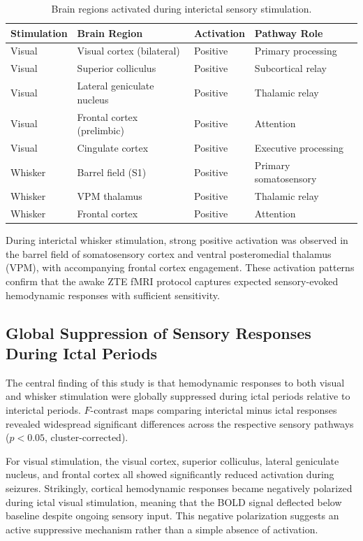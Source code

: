 \documentclass[12pt]{article}
\begin{document}
\begin{table}[htbp]
\centering
\caption{Brain regions activated during interictal sensory stimulation.}
\label{tab:visual}
\begin{tabular}{llll}
\toprule
Stimulation & Brain Region & Activation & Pathway Role \\
\midrule
Visual & Visual cortex (bilateral) & Positive & Primary processing \\
Visual & Superior colliculus & Positive & Subcortical relay \\
Visual & Lateral geniculate nucleus & Positive & Thalamic relay \\
Visual & Frontal cortex (prelimbic) & Positive & Attention \\
Visual & Cingulate cortex & Positive & Executive processing \\
Whisker & Barrel field (S1) & Positive & Primary somatosensory \\
Whisker & VPM thalamus & Positive & Thalamic relay \\
Whisker & Frontal cortex & Positive & Attention \\
\bottomrule
\end{tabular}
\end{table}

During interictal whisker stimulation, strong positive activation was observed in the barrel field of somatosensory cortex and ventral posteromedial thalamus (VPM), with accompanying frontal cortex engagement. These activation patterns confirm that the awake ZTE fMRI protocol captures expected sensory-evoked hemodynamic responses with sufficient sensitivity.

\subsection{Global Suppression of Sensory Responses During Ictal Periods}

The central finding of this study is that hemodynamic responses to both visual and whisker stimulation were globally suppressed during ictal periods relative to interictal periods. $F$-contrast maps comparing interictal minus ictal responses revealed widespread significant differences across the respective sensory pathways ($p < 0.05$, cluster-corrected).

For visual stimulation, the visual cortex, superior colliculus, lateral geniculate nucleus, and frontal cortex all showed significantly reduced activation during seizures. Strikingly, cortical hemodynamic responses became negatively polarized during ictal visual stimulation, meaning that the BOLD signal deflected below baseline despite ongoing sensory input. This negative polarization suggests an active suppressive mechanism rather than a simple absence of activation.
\end{document}
